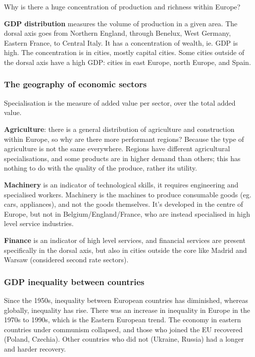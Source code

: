 \documentclass{article}
\begin{document}
Why is there a huge concentration of production and richness within Europe?

\textbf{GDP distribution} measures the volume of production in a given area. The dorsal axis goes from Northern England, through Benelux, West Germany, Eastern France, to Central Italy. It has a concentration of wealth, ie. GDP is high.
The concentration is in cities, mostly capital cities. Some cities outside of the dorsal axis have a high GDP: cities in east Europe, north Europe, and Spain.

\subsubsection{The geography of economic sectors}

Specialisation is the measure of added value per sector, over the total added value.

\textbf{Agriculture}: there is a general distribution of agriculture and construction within Europe, so why are there more performant regions? Because the type of agriculture is not the same everywhere. Regions have different agricultural specialisations, and some products are in higher demand than others; this has nothing to do with the quality of the produce, rather its utility.

\textbf{Machinery} is an indicator of technological skills, it requires engineering and specialised workers. Machinery is the machines to produce consumable goods (eg. cars, appliances), and not the goods themselves. It's developed in the centre of Europe, but not in Belgium/England/France, who are instead specialised in high level service industries.

\textbf{Finance} is an indicator of high level services, and financial services are present specifically in the dorsal axis, but also in cities outside the core like Madrid and Warsaw (considered second rate sectors).

\subsubsection{GDP inequality between countries}

Since the 1950s, inequality between European countries has diminished, whereas globally, inequality has rise. There was an increase in inequality in Europe in the 1970s to 1990s, which is the Eastern European trend. The economy in eastern countries under communism collapsed, and those who joined the EU recovered (Poland, Czechia). Other countries who did not (Ukraine, Russia) had a longer and harder recovery.
\end{document}
